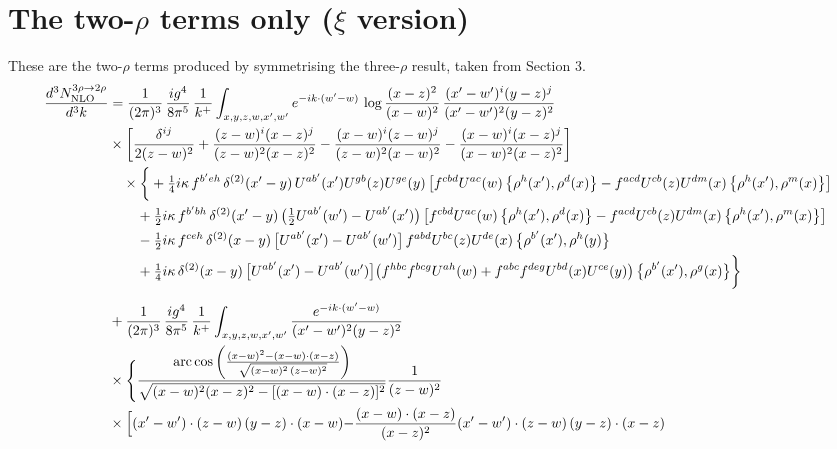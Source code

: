 \documentclass[10pt]{article}
\numberwithin{equation}{section}
\begin{document}
\section{The two-$\rho$ terms only ($\xi$ version)}
These are the two-$\rho$ terms produced by symmetrising the three-$\rho$ result, taken from Section 3.
\begin{align}
\frac{d^{3}N^{3\rho\to2\rho}_{\rm NLO}}{d^{3}k}&=\frac{1}{(2\pi)^{3}}\,\frac{ig^{4}}{8\pi^{5}}\,\frac{1}{k^{+}}\int_{x,y,z,w,x^{\prime},w^{\prime}}e^{-ik\cdot(w^{\prime}-w)}\,\log\frac{(x-z)^{2}}{(x-w)^{2}}\,\frac{(x^{\prime}-w^{\prime})^{i}(y-z)^{j}}{(x^{\prime}-w^{\prime})^{2}(y-z)^{2}}\notag\\
&\times\bigg[\frac{\delta^{ij}}{2(z-w)^{2}}+\frac{(z-w)^{i}(x-z)^{j}}{(z-w)^{2}(x-z)^{2}}-\frac{(x-w)^{i}(z-w)^{j}}{(z-w)^{2}(x-w)^{2}}-\frac{(x-w)^{i}(x-z)^{j}}{(x-w)^{2}(x-z)^{2}}\bigg]\notag\\
&\quad\times\bigg\{+\tfrac14 i\kappa\,f^{b^{\prime}eh}\,\delta^{(2)}(x^{\prime}-y)\,U^{ab^{\prime}}(x^{\prime})U^{gb}(z)U^{ge}(y)\,\big[f^{cbd}U^{ac}(w)\,\big\{\rho^{h}(x^{\prime}),\rho^{d}(x)\big\}-f^{acd}U^{cb}(z)U^{dm}(x)\,\big\{\rho^{h}(x^{\prime}),\rho^{m}(x)\big\}\big]\notag\\
&\qquad+\tfrac12 i\kappa\,f^{b^{\prime}bh}\,\delta^{(2)}(x^{\prime}-y)\,\big(\tfrac12U^{ab^{\prime}}(w^{\prime})-U^{ab^{\prime}}(x^{\prime})\big)\,\big[f^{cbd}U^{ac}(w)\,\big\{\rho^{h}(x^{\prime}),\rho^{d}(x)\big\}-f^{acd}U^{cb}(z)U^{dm}(x)\,\big\{\rho^{h}(x^{\prime}),\rho^{m}(x)\big\}\big]\notag\\
&\qquad-\tfrac12 i\kappa\,f^{ceh}\,\delta^{(2)}(x-y)\,\big[U^{ab^{\prime}}(x^{\prime})-U^{ab^{\prime}}(w^{\prime})\big]\,f^{abd}U^{bc}(z)U^{de}(x)\,\big\{\rho^{b^{\prime}}(x^{\prime}),\rho^{h}(y)\big\}\notag\\
&\qquad+\tfrac14 i\kappa\,\delta^{(2)}(x-y)\,\big[U^{ab^{\prime}}(x^{\prime})-U^{ab^{\prime}}(w^{\prime})\big]\big(f^{hbc}f^{bcg}U^{ah}(w)+f^{abc}f^{deg}U^{bd}(x)U^{ce}(y)\big)\,\big\{\rho^{b^{\prime}}(x^{\prime}),\rho^{g}(x)\big\}\bigg\}\notag\\[6pt]
&+\frac{1}{(2\pi)^{3}}\,\frac{ig^{4}}{8\pi^{5}}\,\frac{1}{k^{+}}\int_{x,y,z,w,x^{\prime},w^{\prime}}\frac{e^{-ik\cdot(w^{\prime}-w)}}{(x^{\prime}-w^{\prime})^{2}(y-z)^{2}}\notag\\
&\times\Bigg\{\frac{\mathrm{arc\,cos}\left(\frac{(x-w)^{2}-(x-w)\cdot (x-z)}{\sqrt{(x-w)^{2}\,(z-w)^{2}}}\right)}{\sqrt{(x-w)^{2}(x-z)^{2}-[(x-w)\cdot(x-z)]^{2}}}\frac{1}{(z-w)^{2}}\notag\\
&\times\Big[{(x^{\prime}-w^{\prime})\cdot(z-w)\,(y-z)\cdot(x-w)}{-\frac{(x-w)\cdot(x-z)}{(x-z)^{2}}(x^{\prime}-w^{\prime})\cdot(z-w)\,(y-z)\cdot(x-z)}\notag\\

\end{align}
\end{document}
